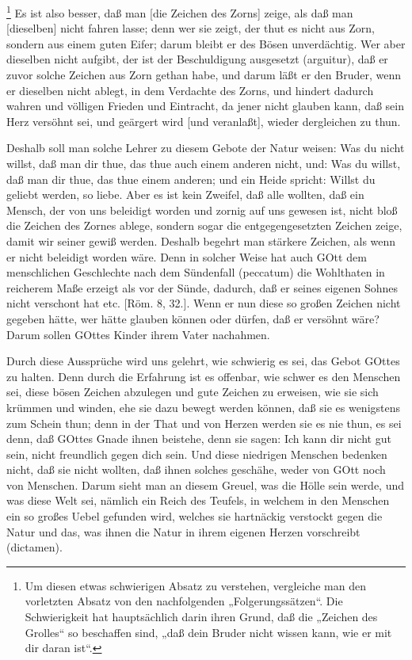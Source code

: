 \footnote{Um diesen etwas schwierigen Absatz zu verstehen, vergleiche man den vorletzten Absatz von den nachfolgenden „Folgerungssätzen“. Die Schwierigkeit hat hauptsächlich darin ihren Grund, daß die „Zeichen des Grolles“ so beschaffen sind, „daß dein Bruder nicht wissen kann, wie er mit dir daran ist“.} Es ist also besser, daß man [die Zeichen des Zorns] zeige, als daß man [dieselben] nicht fahren lasse; denn wer sie zeigt, der thut es nicht aus Zorn, sondern aus einem guten Eifer; darum bleibt er des Bösen unverdächtig. Wer aber dieselben nicht aufgibt, der ist der Beschuldigung ausgesetzt (arguitur), daß er zuvor solche Zeichen aus Zorn gethan habe, und darum läßt er den Bruder, wenn er dieselben nicht ablegt, in dem Verdachte des Zorns, und hindert dadurch wahren und völligen Frieden und Eintracht, da jener nicht glauben kann, daß sein Herz versöhnt sei, und geärgert wird [und veranlaßt], wieder dergleichen zu thun.

Deshalb soll man solche Lehrer zu diesem Gebote der Natur weisen: Was du nicht willst, daß man dir thue, das thue auch einem anderen nicht, und: Was du willst, daß man dir thue, das thue einem anderen; und ein Heide spricht: Willst du geliebt werden, so liebe. Aber es ist kein Zweifel, daß alle wollten, daß ein Mensch, der von uns beleidigt worden und zornig auf uns gewesen ist, nicht bloß die Zeichen des Zornes ablege, sondern sogar die entgegengesetzten Zeichen zeige, damit wir seiner gewiß werden. Deshalb begehrt man stärkere Zeichen, als wenn er nicht beleidigt worden wäre. Denn in solcher Weise hat auch GOtt dem menschlichen Geschlechte nach dem Sündenfall (peccatum) die Wohlthaten in reicherem Maße erzeigt als vor der Sünde, dadurch, daß er seines eigenen Sohnes nicht verschont hat etc. [Röm. 8, 32.]. Wenn er nun diese so großen Zeichen nicht gegeben hätte, wer hätte glauben können oder dürfen, daß er versöhnt wäre? Darum sollen GOttes Kinder ihrem Vater nachahmen.

Durch diese Aussprüche wird uns gelehrt, wie schwierig es sei, das Gebot GOttes zu halten. Denn durch die Erfahrung ist es offenbar, wie schwer es den Menschen sei, diese bösen Zeichen abzulegen und gute Zeichen zu erweisen, wie sie sich krümmen und winden, ehe sie dazu bewegt werden können, daß sie es wenigstens zum Schein thun; denn in der That und von Herzen werden sie es nie thun, es sei denn, daß GOttes Gnade ihnen beistehe, denn sie sagen: Ich kann dir nicht gut sein, nicht freundlich gegen dich sein. Und diese niedrigen Menschen bedenken nicht, daß sie nicht wollten, daß ihnen solches geschähe, weder von GOtt noch von Menschen. Darum sieht man an diesem Greuel, was die Hölle sein werde, und was diese Welt sei, nämlich ein Reich des Teufels, in welchem in den Menschen ein so großes Uebel gefunden wird, welches sie hartnäckig verstockt gegen die Natur und das, was ihnen die Natur in ihrem eigenen Herzen vorschreibt (dictamen).

